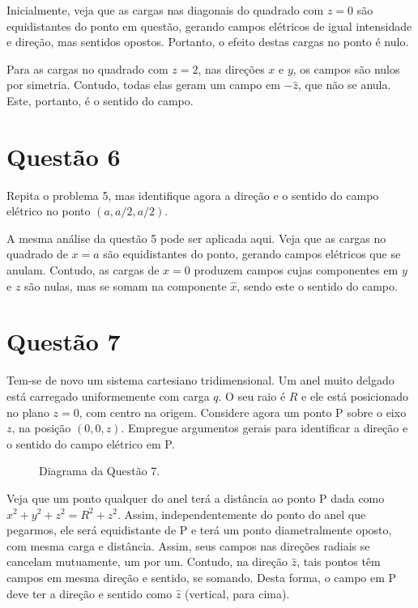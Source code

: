\documentclass[11pt]{article}
\begin{document}
Inicialmente, veja que as cargas nas diagonais do quadrado com \(z=0\) são
equidistantes do ponto em questão, gerando campos elétricos de igual
intensidade e direção, mas sentidos opostos. Portanto, o efeito destas
cargas no ponto é nulo.

Para as cargas no quadrado com \(z=2\), nas direções \(x\) e \(y\), os campos
são nulos por simetria. Contudo, todas elas geram um campo em \(-\hat
z\), que não se anula. Este, portanto, é o sentido do campo.  
\section{Questão 6}
\label{sec:orge3facd3}
Repita o problema 5, mas identifique agora a direção e o sentido do
campo elétrico no ponto \((a,a/2,a/2)\).

A mesma análise da questão 5 pode ser aplicada aqui. Veja que as cargas
no quadrado de \(x=a\) são equidistantes do ponto, gerando campos
elétricos que se anulam. Contudo, as cargas de \(x=0\) produzem campos
cujas componentes em \(y\) e \(z\) são nulas, mas se somam na componente
\(\hat x\), sendo este o sentido do campo. 
\section{Questão 7}
\label{sec:orgb77d051}
Tem-se de novo um sistema cartesiano tridimensional. Um anel muito
delgado está carregado uniformemente com carga \(q\). O seu raio é \(R\) e
ele está posicionado no plano \(z=0\), com centro na origem. Considere
agora um ponto P sobre o eixo \(z\), na posição \((0,0,z)\). Empregue
argumentos gerais para identificar a direção e o sentido do campo
elétrico em P.

\begin{figure}[h!]
  \centering
  \caption{Diagrama da Questão 7.}
  \label{fig:ex-7}
\end{figure}

Veja que um ponto qualquer do anel terá a distância ao ponto P dada como
\(x^2+y^2+z^2=R^2+z^2\). Assim, independentemente do ponto do anel que
pegarmos, ele será equidistante de P e terá um ponto diametralmente
oposto, com mesma carga e distância. Assim, seus campos nas direções
radiais se cancelam mutuamente, um por um. Contudo, na direção \(\hat z\),
tais pontos têm campos em mesma direção e sentido, se somando. Desta
forma, o campo em P deve ter a direção e sentido como \(\hat z\)
(vertical, para cima).
\end{document}
